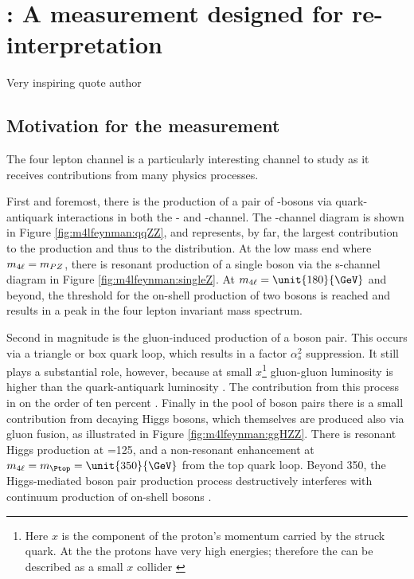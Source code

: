 \chapter{\mFourL: A measurement designed for re-interpretation}
\label{chap:fourlepton}

{Very inspiring quote author}

\section{Motivation for the \mFourL measurement}
\label{sec:fourlepmotivation}

The four lepton channel is a particularly interesting channel to study as it receives contributions from many physics processes.  

First and foremost, there is the production of a pair of \PZ-bosons via quark-antiquark interactions in  both the \Ptop- and \Pup-channel. The \Ptop-channel diagram is shown in Figure \ref{fig:m4lfeynman:qqZZ}, and represents, by far,  the largest contribution to the \ZZ production and thus to the \mFourL distribution. At the low mass end where $m_{4\ell}=m_{PZ}$, there is resonant production of a single \PZ boson via the s-channel diagram in Figure \ref{fig:m4lfeynman:singleZ}. At $\mFourL=\unit{180}{\GeV}$ and beyond, the threshold for the on-shell production of two \PZ bosons is reached and results in a peak in the four lepton invariant mass spectrum. 

Second in magnitude is the gluon-induced production of a \PZ boson pair. This occurs via a triangle or box quark loop, which results in a factor $\alpha_s^2$ suppression. It still plays a substantial role, however, because at small $x$\footnote{Here $x$ is the component of the proton's momentum carried by the struck quark. At the \LHC the protons have very high energies; therefore the \LHC can be described as a small $x$ collider \cite{zotov2012small}} gluon-gluon luminosity is higher than the quark-antiquark luminosity \cite{Glover:194539}. The contribution from this process in on the order of ten percent \cite{Becker:2230817}. Finally in the pool of \PZ boson pairs there is a small contribution from decaying Higgs bosons, which themselves are produced also via gluon fusion, as illustrated in Figure \ref{fig:m4lfeynman:ggHZZ}. There is resonant Higgs production at \mFourL=\unit{125}{\GeV}, and a non-resonant enhancement at $\mFourL=m_{\Ptop}=\unit{350}{\GeV}$ from the top quark loop. Beyond \unit{350}{\GeV}, the Higgs-mediated \PZ boson pair production process destructively interferes with continuum production of on-shell \PZ bosons \cite{Campbell_2016}.

